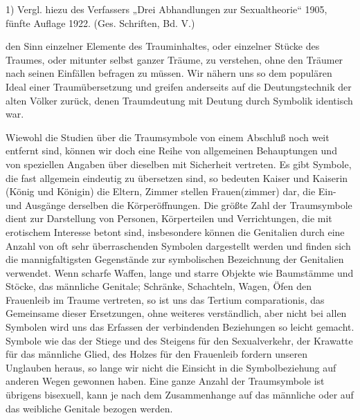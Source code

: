 \documentclass{article}
\begin{document}
            1) Vergl. hiezu des
               Verfassers „Drei Abhandlungen zur Sexualtheorie“ 1905, fünfte Auflage 1922.
               (Ges. Schriften, Bd. V.)
         
            
            
            
        \pstart
        den Sinn einzelner Elemente des Trauminhaltes, oder einzelner Stücke
               des Traumes, oder mitunter selbst ganzer Träume, zu verstehen, ohne den Träumer
               nach seinen Einfällen befragen zu müssen. Wir nähern uns so dem populären Ideal
               einer Traumübersetzung und greifen anderseits auf die Deutungstechnik
               der alten Völker zurück, denen Traumdeutung mit Deutung durch Symbolik
               identisch war.
        \pend
    
            
        \pstart
        Wiewohl die Studien über die Traumsymbole von einem Abschluß noch weit entfernt
               sind, können wir doch eine Reihe von allgemeinen Behauptungen und von speziellen
               Angaben über dieselben mit Sicherheit vertreten. Es gibt Symbole, die fast
               allgemein eindeutig zu übersetzen sind, so bedeuten Kaiser und Kaiserin (König
               und Königin) die Eltern, Zimmer stellen Frauen(zimmer) dar, die Ein- und
               Ausgänge derselben die Körperöffnungen. Die größte Zahl der
               Traumsymbole dient zur Darstellung von Personen, Körperteilen und
               Verrichtungen, die mit erotischem Interesse betont sind, insbesondere können
               die Genitalien durch eine Anzahl von oft sehr überraschenden Symbolen
               dargestellt werden und finden sich die mannigfaltigsten Gegenstände zur
               symbolischen Bezeichnung der Genitalien verwendet. Wenn scharfe
               Waffen, lange und starre Objekte wie Baumstämme und Stöcke, das männliche
               Genitale; Schränke, Schachteln, Wagen, Öfen den Frauenleib im Traume
               vertreten, so ist uns das Tertium comparationis, das Gemeinsame dieser
               Ersetzungen, ohne weiteres verständlich, aber nicht bei allen Symbolen wird uns
               das Erfassen der verbindenden Beziehungen so leicht gemacht. Symbole wie das der
               Stiege und des Steigens für den Sexualverkehr, der Krawatte für das männliche
               Glied, des Holzes für den Frauenleib fordern unseren Unglauben heraus, so
               lange wir nicht die Einsicht in die Symbolbeziehung auf anderen Wegen gewonnen
               haben. Eine ganze Anzahl der Traumsymbole ist übrigens bisexuell, kann je nach
               dem Zusammenhange auf das männliche oder auf das weibliche Genitale bezogen
               werden.
        \pend
    
\end{document}
